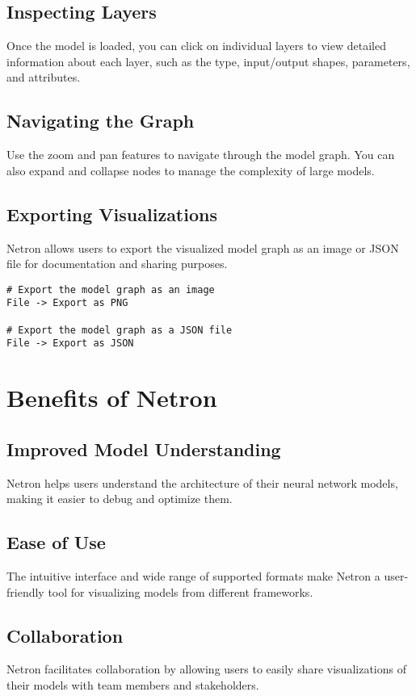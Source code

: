 \subsection{Inspecting Layers}
Once the model is loaded, you can click on individual layers to view detailed information about each layer, such as the type, input/output shapes, parameters, and attributes.

\subsection{Navigating the Graph}
Use the zoom and pan features to navigate through the model graph. You can also expand and collapse nodes to manage the complexity of large models.

\subsection{Exporting Visualizations}
Netron allows users to export the visualized model graph as an image or JSON file for documentation and sharing purposes.

\begin{verbatim}
# Export the model graph as an image
File -> Export as PNG

# Export the model graph as a JSON file
File -> Export as JSON
\end{verbatim}

\section{Benefits of Netron}

\subsection{Improved Model Understanding}
Netron helps users understand the architecture of their neural network models, making it easier to debug and optimize them.

\subsection{Ease of Use}
The intuitive interface and wide range of supported formats make Netron a user-friendly tool for visualizing models from different frameworks.

\subsection{Collaboration}
Netron facilitates collaboration by allowing users to easily share visualizations of their models with team members and stakeholders.

